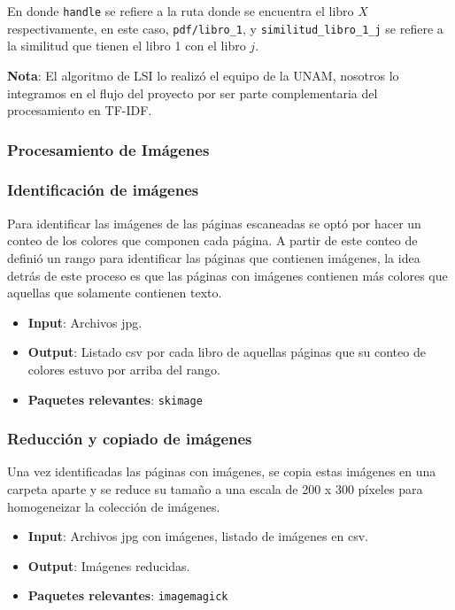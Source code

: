 En donde \texttt{handle} se refiere a la ruta donde se encuentra el libro $X$ respectivamente, en este caso,  \texttt{pdf/libro\_1}, y \texttt{similitud\_libro\_1\_j} se refiere a la similitud que tienen el libro 1 con el libro $j$. 

\textbf{Nota}: El algoritmo de LSI lo realizó el equipo de la UNAM, nosotros lo integramos en el flujo del proyecto por ser parte  complementaria del procesamiento en TF-IDF. 

\subsubsection{Procesamiento de Imágenes}

\subsubsection{ Identificación de imágenes}

Para identificar las imágenes de las páginas escaneadas se optó por hacer un conteo de los  colores que componen cada  página. A partir de este conteo de definió un rango para identificar las páginas que contienen imágenes, la idea detrás de este proceso es que las páginas con  imágenes contienen más colores que aquellas que solamente contienen texto. 



\begin{itemize}
\item \textbf{Input}: Archivos jpg.
\item \textbf{Output}: Listado csv por cada libro de aquellas páginas que su conteo de colores estuvo por arriba del rango.
\item \textbf{Paquetes relevantes}: \texttt{skimage}
\end{itemize}



\subsubsection{ Reducción y copiado de imágenes}

Una vez identificadas las páginas con imágenes, se copia estas imágenes  en una carpeta aparte y se reduce su tamaño a una escala de  200 x 300 píxeles  para homogeneizar la colección de imágenes. 

\begin{itemize}
\item \textbf{Input}: Archivos jpg con imágenes, listado de imágenes en csv.
\item \textbf{Output}: Imágenes reducidas.
\item \textbf{Paquetes relevantes}: \texttt{imagemagick}
\end{itemize}
 
